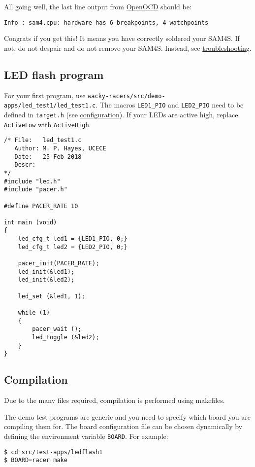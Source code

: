 All going well, the last line output from \url{OpenOCD} should be:

\begin{verbatim}
Info : sam4.cpu: hardware has 6 breakpoints, 4 watchpoints
\end{verbatim}

Congrats if you get this! It means you have correctly soldered your
SAM4S. If not, do not despair and do not remove your SAM4S. Instead,
see \protect\hyperref[troubleshooting]{troubleshooting}.


\subsection{LED flash program}
\label{led-flash-program}

For your first program, use
\texttt{wacky-racers/src/demo-apps/led\_test1/led\_test1.c}. The macros
\texttt{LED1\_PIO} and \texttt{LED2\_PIO} need to be defined in
\texttt{target.h} (see
\protect\hyperref[configuration]{configuration}). If your LEDs are
active high, replace \texttt{ActiveLow} with \texttt{ActiveHigh}.

\begin{verbatim}
/* File:   led_test1.c
   Author: M. P. Hayes, UCECE
   Date:   25 Feb 2018
   Descr: 
*/
#include "led.h"
#include "pacer.h"

#define PACER_RATE 10

int main (void)
{
    led_cfg_t led1 = {LED1_PIO, 0;}
    led_cfg_t led2 = {LED2_PIO, 0;}

    pacer_init(PACER_RATE);
    led_init(&led1);
    led_init(&led2);

    led_set (&led1, 1);

    while (1)
    {
        pacer_wait ();
        led_toggle (&led2);
    }
}
\end{verbatim}

\subsection{Compilation}
\label{compilation}

Due to the many files required, compilation is performed using
makefiles.

The demo test programs are generic and you need to specify which board
you are compiling them for. The board configuration file can be chosen
dynamically by defining the environment variable \texttt{BOARD}. For
example:
%
\begin{verbatim}
$ cd src/test-apps/ledflash1
$ BOARD=racer make
\end{verbatim}

